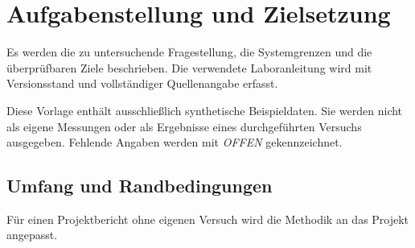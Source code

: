 \chapter{Aufgabenstellung und Zielsetzung}
\label{chap:objective}

Es werden die zu untersuchende Fragestellung, die Systemgrenzen und die
überprüfbaren Ziele beschrieben. Die verwendete Laboranleitung wird mit
Versionsstand und vollständiger Quellenangabe erfasst.

Diese Vorlage enthält ausschließlich synthetische Beispieldaten. Sie
werden nicht als eigene Messungen oder als Ergebnisse eines durchgeführten
Versuchs ausgegeben. Fehlende Angaben werden mit \emph{OFFEN} gekennzeichnet.

\section{Umfang und Randbedingungen}
Für einen Projektbericht ohne eigenen Versuch wird die Methodik an das
Projekt angepasst.
